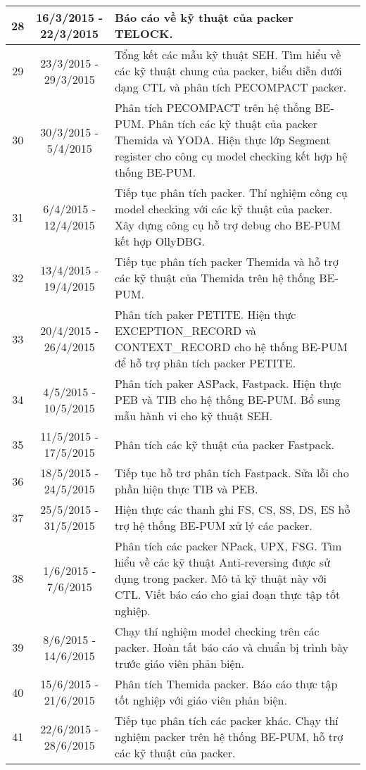 \begin{center}
\begin{longtable}{|c|c|p{8cm}|}
\hline
28					& 16/3/2015 - 22/3/2015			& Báo cáo về kỹ thuật của packer TELOCK.\\
\hline
29					& 23/3/2015 - 29/3/2015			& Tổng kết các mẫu kỹ thuật SEH. Tìm hiểu về các kỹ thuật chung của packer, biểu diễn dưới dạng CTL và phân tích PECOMPACT packer.\\
\hline
30					& 30/3/2015 - 5/4/2015			& Phân tích PECOMPACT trên hệ thống BE-PUM. Phân tích các kỹ thuật của packer Themida và YODA. Hiện thực lớp Segment register cho công cụ model checking kết hợp hệ thống BE-PUM.\\
\hline
31					& 6/4/2015 - 12/4/2015			& Tiếp tục phân tích packer. Thí nghiệm công cụ model checking với các kỹ thuật của packer. Xây dựng công cụ hỗ trợ debug cho BE-PUM kết hợp OllyDBG.\\
\hline
32					& 13/4/2015 - 19/4/2015			& Tiếp tục phân tích packer Themida và hỗ trợ các kỹ thuật của Themida trên hệ thống BE-PUM.\\
\hline
33					& 20/4/2015 - 26/4/2015			& Phân tích paker PETITE. Hiện thực EXCEPTION\_RECORD và CONTEXT\_RECORD cho hệ thống BE-PUM để hỗ trợ phân tích packer PETITE.\\
\hline
34					& 4/5/2015 - 10/5/2015			& Phân tích paker ASPack, Fastpack. Hiện thực PEB và TIB cho hệ thống BE-PUM. Bổ sung mẫu hành vi cho kỹ thuật SEH.\\
\hline
35					& 11/5/2015 - 17/5/2015			& Phân tích các kỹ thuật của packer Fastpack.\\
\hline
36					& 18/5/2015 - 24/5/2015			& Tiếp tục hỗ trơ phân tích Fastpack. Sửa lỗi cho phần hiện thực TIB và PEB.\\
\hline
37					& 25/5/2015 - 31/5/2015			& Hiện thực các thanh ghi FS, CS, SS, DS, ES hỗ trợ hệ thống BE-PUM xử lý các packer.\\
\hline
38					& 1/6/2015 - 7/6/2015			& Phân tích các packer NPack, UPX, FSG. Tìm hiểu về các kỹ thuật Anti-reversing được sử dụng trong packer. Mô tả kỹ thuật này với CTL. Viết báo cáo cho giai đoạn thực tập tốt nghiệp.\\
\hline
39					& 8/6/2015 - 14/6/2015			& Chạy thí nghiệm model checking trên các packer. Hoàn tất báo cáo và chuẩn bị trình bày trước giáo viên phản biện.\\
\hline
40					& 15/6/2015 - 21/6/2015			& Phân tích Themida packer. Báo cáo thực tập tốt nghiệp với giáo viên phản biện.\\
\hline
41					& 22/6/2015 - 28/6/2015			& Tiếp tục phân tích các packer khác. Chạy thí nghiệm packer trên hệ thống BE-PUM, hỗ trợ các kỹ thuật của packer.\\

\end{longtable}
\end{center}
